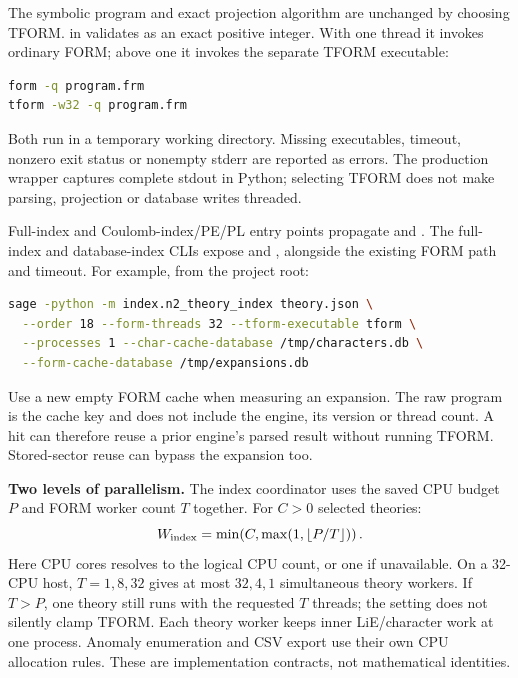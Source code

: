 \clearpage
{}
\label{sec:tform-runtime}
The symbolic program and exact projection algorithm are unchanged by choosing
TFORM.  in  validates  as an
exact positive integer. With one thread it invokes ordinary FORM; above one
it invokes the separate TFORM executable:
\begin{lstlisting}[language=bash]
form -q program.frm
tform -w32 -q program.frm
\end{lstlisting}
Both run in a temporary working directory. Missing executables, timeout,
nonzero exit status or nonempty stderr are reported as errors. The production
wrapper captures complete stdout in Python; selecting TFORM does not make
parsing, projection or database writes threaded.

Full-index and Coulomb-index/PE/PL entry points propagate
 and . The full-index and
database-index CLIs expose  and
, alongside the existing FORM path and timeout.
For example, from the project root:
\begin{lstlisting}[language=bash]
sage -python -m index.n2_theory_index theory.json \
  --order 18 --form-threads 32 --tform-executable tform \
  --processes 1 --char-cache-database /tmp/characters.db \
  --form-cache-database /tmp/expansions.db
\end{lstlisting}
Use a new empty FORM cache when measuring an expansion. The raw program is
the cache key and does not include the engine, its version or thread count.
A hit can therefore reuse a prior engine's parsed result without running
TFORM. Stored-sector reuse can bypass the expansion too.

\textbf{Two levels of parallelism.} The index coordinator uses the saved CPU
budget $P$ and FORM worker count $T$ together. For $C>0$ selected theories:
\[
 W_{\rm index}=\min\!\left(C,\max\!\left(1,
                    \left\lfloor P/T\right\rfloor\right)\right).
\]
Here CPU cores \code{-1} resolves to the logical CPU count, or one if unavailable.
On a 32-CPU host, $T=1,8,32$ gives at most $32,4,1$ simultaneous theory workers.
If $T>P$, one theory still runs with the requested $T$ threads; the setting
does not silently clamp TFORM. Each theory worker keeps inner LiE/character
work at one process. Anomaly enumeration and CSV export use their own CPU
allocation rules. These are implementation contracts, not mathematical identities.

